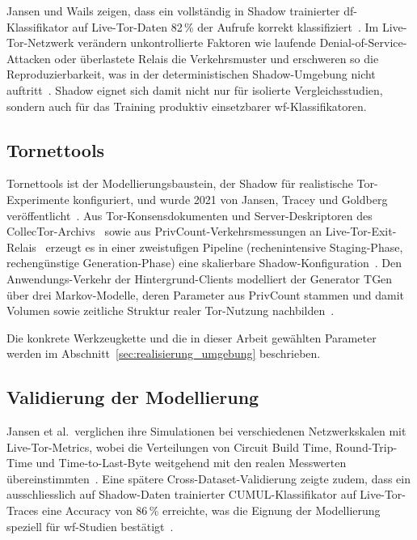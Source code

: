 Jansen und Wails zeigen, dass ein vollständig in Shadow trainierter \gls{df}-Klassifikator auf Live-Tor-Daten 82\,\% der Aufrufe korrekt klassifiziert~\cite{jansen2023data}.
Im Live-Tor-Netzwerk verändern unkontrollierte Faktoren wie laufende Denial-of-Service-Attacken oder überlastete Relais die Verkehrsmuster und erschweren so die Reproduzierbarkeit, was in der deterministischen Shadow-Umgebung nicht auftritt~\cite{jansen2023data}.
Shadow eignet sich damit nicht nur für isolierte Vergleichsstudien, sondern auch für das Training produktiv einsetzbarer \gls{wf}-Klassifikatoren.



\subsection{Tornettools}

Tornettools ist der Modellierungsbaustein, der Shadow für realistische Tor-Experimente konfiguriert, und wurde 2021 von Jansen, Tracey und Goldberg veröffentlicht~\cite{neverenough-sec2021}.
Aus Tor-Konsensdokumenten und Server-Deskriptoren des CollecTor-Archivs~\cite{tormetricsabout} sowie aus PrivCount-Verkehrsmessungen an Live-Tor-Exit-Relais~\cite{mani2018understanding} erzeugt es in einer zweistufigen Pipeline (rechenintensive Staging-Phase, rechengünstige Generation-Phase) eine skalierbare Shadow-Konfiguration~\cite{neverenough-sec2021}.
Den Anwendungs-Verkehr der Hintergrund-Clients modelliert der Generator TGen über drei Markov-Modelle, deren Parameter aus PrivCount stammen und damit Volumen sowie zeitliche Struktur realer Tor-Nutzung nachbilden~\cite{neverenough-sec2021}.

Die konkrete Werkzeugkette und die in dieser Arbeit gewählten Parameter werden im Abschnitt~\ref{sec:realisierung_umgebung} beschrieben.

\subsection{Validierung der Modellierung}

Jansen et al.\ verglichen ihre Simulationen bei verschiedenen Netzwerkskalen mit Live-Tor-Metrics, wobei die Verteilungen von Circuit Build Time, Round-Trip-Time und Time-to-Last-Byte weitgehend mit den realen Messwerten übereinstimmten~\cite{neverenough-sec2021}.
Eine spätere Cross-Dataset-Validierung zeigte zudem, dass ein ausschliesslich auf Shadow-Daten trainierter CUMUL-Klassifikator auf Live-Tor-Traces eine Accuracy von 86\,\% erreichte, was die Eignung der Modellierung speziell für \gls{wf}-Studien bestätigt~\cite{jansen2023data}.

